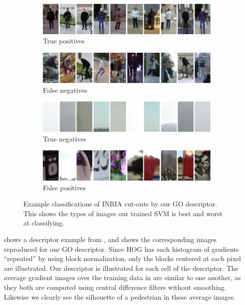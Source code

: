 \documentclass[thesis.tex]{subfiles}
\begin{document}
%
\begin{figure}[p]
	\begin{subfigure}[t]{\textwidth}
		\centerline{\includegraphics[width=1.2\textwidth]{img/objectDetectionTP.png}}
		\caption{True positives}
		\label{fig:objectDetectionTP}
		\vspace{2mm}
	\end{subfigure}
	\begin{subfigure}[t]{\textwidth}
		\centerline{\includegraphics[width=1.2\textwidth]{img/objectDetectionFN.png}}
		\caption{False negatives}
		\label{fig:objectDetectionFN}
		\vspace{2mm}
	\end{subfigure}
	\begin{subfigure}[t]{\textwidth}
		\centerline{\includegraphics[width=1.2\textwidth]{img/objectDetectionTN.png}}
		\caption{True negatives}
		\label{fig:objectDetectionTN}
		\vspace{2mm}
	\end{subfigure}
	\begin{subfigure}[t]{\textwidth}
		\centerline{\includegraphics[width=1.2\textwidth]{img/objectDetectionFP.png}}
		\caption{False positives}
		\label{fig:objectDetectionFP}
	\end{subfigure}
	\caption{Example classifications of INRIA cut-outs by our GO descriptor. This shows the types of images our trained SVM is best and worst at classifying.}
	\label{fig:ownDescriptorExample}
\end{figure}
%
 shows a descriptor example from \citet{dalal2005histograms}, and  shows the corresponding images reproduced for our GO descriptor. Since HOG has each histogram of gradients ``repeated'' by using block normalization, only the blocks centered at each pixel are illustrated. Our descriptor is illustrated for each cell of the descriptor. The average gradient images over the training data in  are similar to one another, as they both are computed using central difference filters without smoothing. Likewise we clearly see the silhouette of a pedestrian in these average images.
\end{document}
